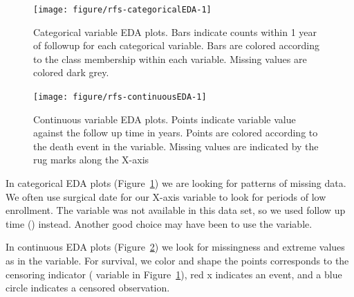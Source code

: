 \documentclass[nojss]{jss}\usepackage[]{graphicx}\usepackage[]{color}
\begin{document}
\begin{Schunk}
\begin{figure}[!htpb]

{\centering \texttt{[image: figure/rfs-categoricalEDA-1]} 

}

\caption[Categorical variable EDA plots]{Categorical variable EDA plots. Bars indicate counts within 1 year of followup for each categorical variable. Bars are colored according to the class membership within each variable. Missing values are colored dark grey.\label{fig:categoricalEDA}}
\end{figure}
\end{Schunk}


\begin{Schunk}
\begin{figure}[!htpb]

{\centering \texttt{[image: figure/rfs-continuousEDA-1]} 

}

\caption[Continuous variable EDA plots]{Continuous variable EDA plots. Points indicate variable value against the follow up time in years. Points are colored according to the death event in the   variable. Missing values are indicated by the rug marks along the X-axis\label{fig:continuousEDA}}
\end{figure}
\end{Schunk}

In categorical EDA plots (Figure~\ref{fig:categoricalEDA}) we are looking for patterns of missing data. We often use surgical date for our X-axis variable to look for periods of low enrollment. The variable was not available in this data set, so we used follow up time () instead. Another good choice may have been to use the  variable.

In continuous EDA plots (Figure~\ref{fig:continuousEDA}) we look for missingness and extreme values as in the  variable. For survival, we color and shape the points corresponds to the censoring indicator ( variable in Figure~\ref{fig:categoricalEDA}), red x indicates an event, and a blue circle indicates a censored observation.
\end{document}
